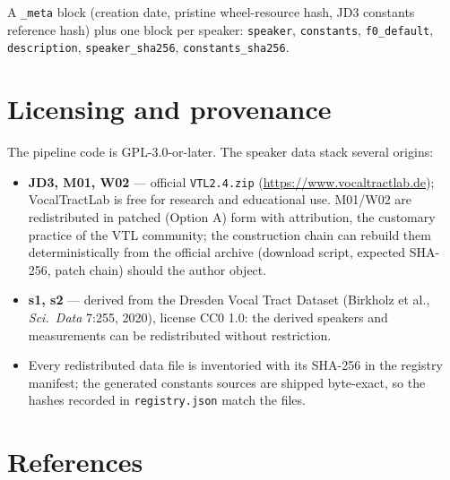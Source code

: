 \documentclass[11pt,a4paper]{article}
\newcommand{\code}[1]{\texttt{#1}}
\begin{document}
A \code{\_meta} block (creation date, pristine wheel-resource hash,
JD3 constants reference hash) plus one block per speaker:
\code{speaker}, \code{constants}, \code{f0\_default},
\code{description}, \code{speaker\_sha256}, \code{constants\_sha256}.

\section{Licensing and provenance}\label{sec:license}

The pipeline code is GPL-3.0-or-later. The speaker data stack several
origins:

\begin{itemize}[leftmargin=1.5em]
\item \textbf{JD3, M01, W02} --- official \code{VTL2.4.zip}
      (\url{https://www.vocaltractlab.de}); VocalTractLab is free for
      research and educational use. M01/W02 are redistributed in
      patched (Option A) form with attribution, the customary
      practice of the VTL community; the construction chain can
      rebuild them deterministically from the official archive
      (download script, expected SHA-256, patch chain) should the
      author object.
\item \textbf{s1, s2} --- derived from the Dresden Vocal Tract
      Dataset (Birkholz et al., \emph{Sci.\ Data} 7:255, 2020),
      license CC0 1.0: the derived speakers and measurements can be
      redistributed without restriction.
\item Every redistributed data file is inventoried with its SHA-256
      in the registry manifest; the generated constants sources are
      shipped byte-exact, so the hashes recorded in
      \code{registry.json} match the files.
\end{itemize}

\section{References}\label{sec:refs}
\end{document}

